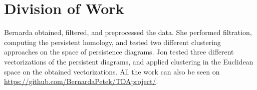 \documentclass[12pt]{article}
\begin{document}
\section{Division of Work}
Bernarda obtained, filtered, and preprocessed the data. She performed filtration, computing the persistent homology, and tested two different clustering approaches on the space of persistence diagrams.
Jon tested three different vectorizations of the persistent diagrams, and applied clustering in the Euclidean space on the obtained vectorizations. 
All the work can also be seen on 
\url{https://github.com/BernardaPetek/TDAproject/}.

	
	
	
\end{document}
